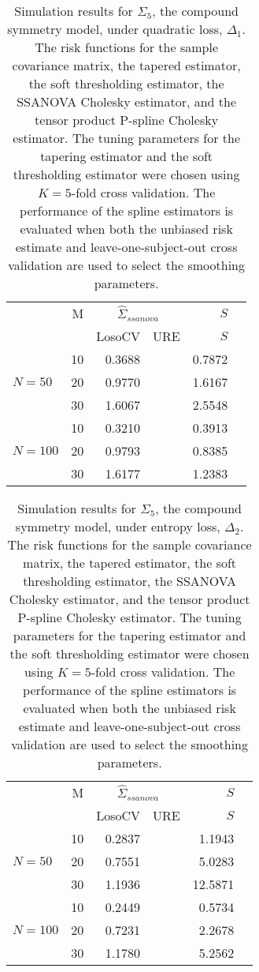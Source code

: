 \documentclass[12pt]{article}
\theoremstyle{definition}
\begin{document}
\begin{table}[ht]
\centering
\caption{Simulation results for $\Sigma_5$, the compound symmetry model, under quadratic loss, $\Delta_1$. The risk functions for the sample covariance matrix, the tapered estimator, the soft thresholding estimator, the SSANOVA Cholesky estimator, and the tensor product P-spline Cholesky estimator. The tuning parameters for the tapering estimator and the soft thresholding estimator were chosen using $K = 5$-fold cross validation. The performance of the spline estimators is evaluated when both the unbiased risk estimate and leave-one-subject-out cross validation are used to select the smoothing parameters.}

\begin{tabular}{lrrrrr}
& M & \multicolumn{2}{c}{$\hat{\Sigma}_{ssanova}$} & $S$ \\ 
& & \mbox{LosoCV} & \mbox{URE} & $S$ \\ 
  \hline
 &    10 & 0.3688 & & 0.7872 \\ 
$N = 50$ &    20 & 0.9770 & & 1.6167 \\ 
  &    30 & 1.6067 &&  2.5548 \\ \hdashline
  &    10 & 0.3210 & & 0.3913 \\ 
  $N = 100$ &    20 & 0.9793 &  &  0.8385 \\ 
   &    30 & 1.6177 & & 1.2383 \\ 
   \hline
\end{tabular}
\end{table}

\begin{table}[ht]
\centering
\caption{Simulation results for $\Sigma_5$, the compound symmetry model, under entropy loss, $\Delta_2$. The risk functions for the sample covariance matrix, the tapered estimator, the soft thresholding estimator, the SSANOVA Cholesky estimator, and the tensor product P-spline Cholesky estimator. The tuning parameters for the tapering estimator and the soft thresholding estimator were chosen using $K = 5$-fold cross validation. The performance of the spline estimators is evaluated when both the unbiased risk estimate and leave-one-subject-out cross validation are used to select the smoothing parameters.}
\begin{tabular}{lrrrrr}
& M & \multicolumn{2}{c}{$\hat{\Sigma}_{ssanova}$} & $S$ \\ 
&  & \mbox{LosoCV} & \mbox{URE} & $S$ \\ 
  \hline
 &    10 & 0.2837 & & 1.1943 \\ 
$N = 50$&    20 & 0.7551& & 5.0283 \\ 
  &    30 & 1.1936 & & 12.5871 \\ \hdashline
 &    10 & 0.2449 & & 0.5734 \\ 
  $N = 100$ &    20 & 0.7231 & & 2.2678 \\ 
   &    30 & 1.1780 & &5.2562 \\
  \end{tabular}
\end{table}
\end{document}
